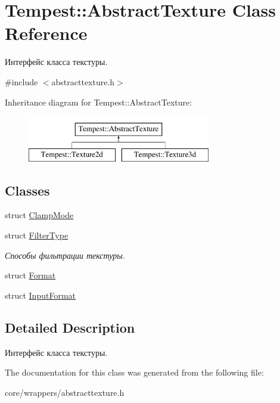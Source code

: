 \hypertarget{class_tempest_1_1_abstract_texture}{\section{Tempest\+:\+:Abstract\+Texture Class Reference}
\label{class_tempest_1_1_abstract_texture}
}


Интерфейс класса текстуры.  




{\ttfamily \#include $<$abstracttexture.\+h$>$}

Inheritance diagram for Tempest\+:\+:Abstract\+Texture\+:\begin{figure}[H]
\begin{center}
\leavevmode
\includegraphics[height=2.000000cm]{class_tempest_1_1_abstract_texture}
\end{center}
\end{figure}
\subsection*{Classes}
\begin{DoxyCompactItemize}
\item 
struct \hyperlink{struct_tempest_1_1_abstract_texture_1_1_clamp_mode}{Clamp\+Mode}
\item 
struct \hyperlink{struct_tempest_1_1_abstract_texture_1_1_filter_type}{Filter\+Type}
\begin{DoxyCompactList}\small\item\em Способы фильтрации текстуры. \end{DoxyCompactList}\item 
struct \hyperlink{struct_tempest_1_1_abstract_texture_1_1_format}{Format}
\item 
struct \hyperlink{struct_tempest_1_1_abstract_texture_1_1_input_format}{Input\+Format}
\end{DoxyCompactItemize}


\subsection{Detailed Description}
Интерфейс класса текстуры. 

The documentation for this class was generated from the following file\+:\begin{DoxyCompactItemize}
\item 
core/wrappers/abstracttexture.\+h\end{DoxyCompactItemize}
